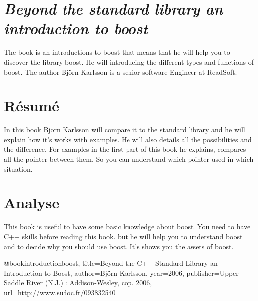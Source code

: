 \documentclass[a4paper,11pt]{report}
\begin{document}
\section{\emph{Beyond the standard library an introduction to boost}}

The book is an introductions to boost that means that he will help you
to discover the library boost. He will introducing the different types
and functions of boost. The author
Björn Karlsson is a senior software Engineer at ReadSoft.

\section{Résumé}

In this book Bjorn Karlsson will compare it to the standard library
and he will explain how it's works with examples.
He will also details all the possibilities and the difference. For
examples in the first part of this book he explains, compares all the
pointer between them. So you can understand which pointer used in
which situation.


\section{Analyse}

This book is useful to have some basic knowledge about boost. You need
to have C++ skills before reading this book. but he will help you to
understand boost and to decide why you should use boost.
It's shows you the assets of boost.


@book{introductionboost,
title={Beyond the C++ Standard Library an Introduction to Boost},
author={Björn Karlsson},
  year={2006},
  publisher={Upper Saddle River (N.J.) : Addison-Wesley, cop. 2006},
	url={http://www.sudoc.fr/093832540}
}
\end{document}
